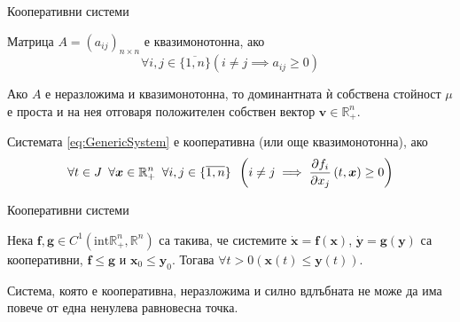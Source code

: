 \begin{frame}[t]{Кооперативни системи}
  \begin{definition}
    Матрица $A=(a_{ij})_{n \times n}$ е квазимонотонна, ако
    \begin{equation*}
      \forall{i,j \in \{\overline{1,n}\}} \left(i \neq j \implies a_{ij} \geq 0\right)
    \end{equation*}
  \end{definition}

  \begin{theorem}
    Ако $A$ е неразложима и квазимонотонна, то доминантната ѝ собствена стойност $\mu$ е проста и на нея отговаря положителен собствен вектор $\boldsymbol{v} \in \mathbb{R}_{+}^n$.
  \end{theorem}
  
  \begin{definition}
    \label{def:Cooperative}
    Системата \ref{eq:GenericSystem} е кооперативна (или още квазимонотонна), ако
    \begin{equation}
      \forall{t \in J} \hspace{0.5em} \forall{\boldsymbol{x} \in \mathbb{R}_{+}^n} \hspace{0.5em} \forall{i,j \in \{\overline{1,n}\}} \hspace{0.5em} \left(i \neq j \implies \pdv{f_i}{x_j}\left(t, \boldsymbol{x}\right) \geq 0\right)
    \end{equation}
  \end{definition}

\end{frame}

\begin{frame}[t]{Кооперативни системи}
  \begin{theorem}
    \label{thm:Comparison}
    Нека $\boldsymbol{f}, \boldsymbol{g} \in C^1(\mathrm{int} \mathbb{R}_{+}^n, \mathbb{R}^n)$ са такива, че системите $\dot{\boldsymbol{x}}=\boldsymbol{f}(\boldsymbol{x})$, $\dot{\boldsymbol{y}}=\boldsymbol{g}(\boldsymbol{y})$ са кооперативни, $\boldsymbol{f} \leq \boldsymbol{g}$ и $\boldsymbol{x}_0 \leq \boldsymbol{y}_0$. Тогава $\forall{t>0}(\boldsymbol{x}(t) \leq \boldsymbol{y}(t))$.
  \end{theorem}

  \begin{theorem}
    Система, която е кооперативна, неразложима и силно вдлъбната не може да има повече от една ненулева равновесна точка.
  \end{theorem}
\end{frame}
